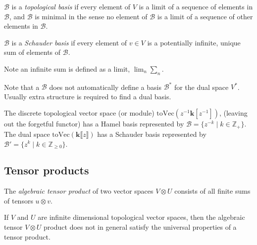         
        \begin{defn}
        \( \mathcal{B}\) is a \emph{topological basis} if every element of \( V\) is a limit of a sequence of elements in \(\mathcal{B}\), and \( \mathcal{B}\) is minimal in the sense no element of \( \mathcal{B}\) is a limit of a sequence of other elements in \( \mathcal{B}\).
        \end{defn}
        
        
        \begin{defn}
        \( \mathcal{B}\) is a \emph{Schauder basis} if every element of \(v \in V\) is a potentially infinite, unique sum of elements of \( \mathcal{B}\).
        \end{defn}

        Note an infinite sum is defined as a limit, \(\lim_n \sum_{n}\). 
        
        
        \begin{rem} Note that a \( \mathcal{B}\) does not automatically define a basis \( \mathcal{B}^*\) for the dual space \( V^*\). Usually extra structure is required to find a dual basis.
        \end{rem}
        
        \begin{ex} 
        \label{ex:hamelandschaud}
        The discrete topological vector space (or module) \( \mathrm{toVec}(z^{-1} \mathbf{k}[z^{-1}])\), (leaving out the forgetful functor) has a Hamel basis represented by \(\mathcal{B}= \{ z^{-k}\; |\; k \in \mathbb{Z}_{+}\}\). The dual space \( \mathrm{toVec}(\mathbf{k} \lBrack z \rBrack )\) has a Schauder basis represented by \( \mathcal{B}' = \{ z^{k}\; | \; k \in \mathbb{Z}_{\geq 0}\}\).
        \end{ex}
        
        \fi 
    
        \subsection{Tensor products}
        \begin{defn} 
        \label{defn:algdual}
        The \emph{algebraic tensor product} of two vector spaces \(V \otimes U \) consists of all finite sums of tensors \( u \otimes v\). 
         \end{defn} 
         
        If \(V\) and \(U\) are infinite dimensional topological vector spaces, then the algebraic tensor \(V \otimes U\) product does not in general satisfy the universal properties of a tensor product.
         
